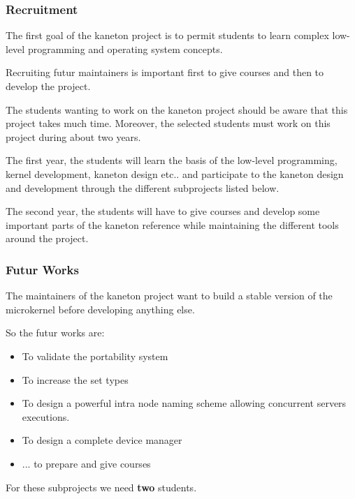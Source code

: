 \documentclass[8pt]{beamer}
\newcommand{\nl}[0]{\vspace{0.4cm}}
\begin{document}

\begin{frame}
  \frametitle{Recruitment}

  The first goal of the kaneton project is to permit students to
  learn complex low-level programming and operating system concepts.

  \nl

  Recruiting futur maintainers is important first to give courses
  and then to develop the project.

  \nl

  The students wanting to work on the kaneton project should be aware
  that this project takes much time. Moreover, the selected students
  must work on this project during about two years.

  \nl

  The first year, the students will learn the basis of the low-level
  programming, kernel development, kaneton design etc.. and participate
  to the kaneton design and development through the different subprojects
  listed below.

  \nl

  The second year, the students will have to give courses and develop
  some important parts of the kaneton reference while maintaining the
  different tools around the project.
\end{frame}


\begin{frame}
  \frametitle{Futur Works}

  The maintainers of the kaneton project want to build a stable version
  of the microkernel before developing anything else.

  \nl

  So the futur works are:

  \begin{itemize}[<+->]
    \item
      To validate the portability system
    \item
      To increase the set types
    \item
      To design a powerful intra node naming scheme allowing concurrent
      servers executions.
    \item
      To design a complete device manager
    \item
      ... to prepare and give courses
  \end{itemize}

  \nl

  For these subprojects we need \textbf{two} students.
\end{frame}
\end{document}
